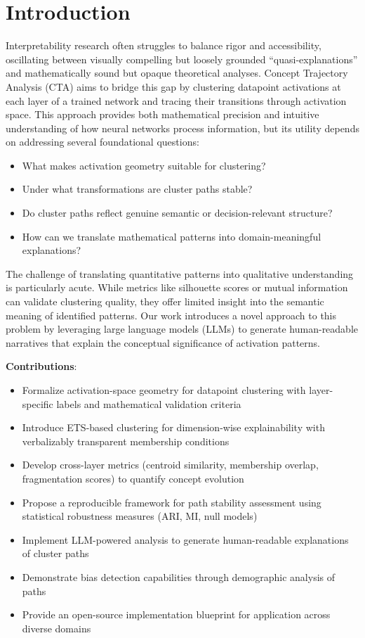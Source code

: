\section{Introduction}

Interpretability research often struggles to balance rigor and accessibility, oscillating between visually compelling but loosely grounded ``quasi-explanations'' and mathematically sound but opaque theoretical analyses. Concept Trajectory Analysis (CTA) aims to bridge this gap by clustering datapoint activations at each layer of a trained network and tracing their transitions through activation space. This approach provides both mathematical precision and intuitive understanding of how neural networks process information, but its utility depends on addressing several foundational questions:

\begin{itemize}
    \item What makes activation geometry suitable for clustering?
    \item Under what transformations are cluster paths stable?
    \item Do cluster paths reflect genuine semantic or decision-relevant structure?
    \item How can we translate mathematical patterns into domain-meaningful explanations?
\end{itemize}

The challenge of translating quantitative patterns into qualitative understanding is particularly acute. While metrics like silhouette scores or mutual information can validate clustering quality, they offer limited insight into the semantic meaning of identified patterns. Our work introduces a novel approach to this problem by leveraging large language models (LLMs) to generate human-readable narratives that explain the conceptual significance of activation patterns.

\textbf{Contributions}:
\begin{itemize}
    \item Formalize activation-space geometry for datapoint clustering with layer-specific labels and mathematical validation criteria
    \item Introduce ETS-based clustering for dimension-wise explainability with verbalizably transparent membership conditions
    \item Develop cross-layer metrics (centroid similarity, membership overlap, fragmentation scores) to quantify concept evolution
    \item Propose a reproducible framework for path stability assessment using statistical robustness measures (ARI, MI, null models)
    \item Implement LLM-powered analysis to generate human-readable explanations of cluster paths
    \item Demonstrate bias detection capabilities through demographic analysis of paths
    \item Provide an open-source implementation blueprint for application across diverse domains
\end{itemize}